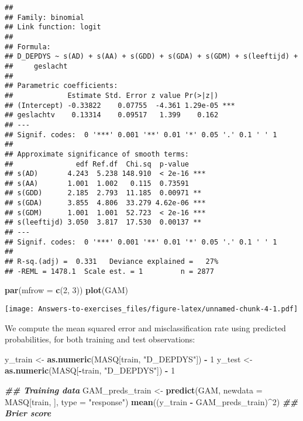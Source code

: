 \documentclass[
]{article}
\newenvironment{Shaded}{\begin{snugshade}}{\end{snugshade}}
\newcommand{\AttributeTok}[1]{\textcolor[rgb]{0.13,0.29,0.53}{#1}}
\newcommand{\DecValTok}[1]{\textcolor[rgb]{0.00,0.00,0.81}{#1}}
\newcommand{\DocumentationTok}[1]{\textcolor[rgb]{0.56,0.35,0.01}{\textbf{\textit{#1}}}}
\newcommand{\FunctionTok}[1]{\textcolor[rgb]{0.13,0.29,0.53}{\textbf{#1}}}
\newcommand{\NormalTok}[1]{#1}
\newcommand{\OtherTok}[1]{\textcolor[rgb]{0.56,0.35,0.01}{#1}}
\newcommand{\SpecialCharTok}[1]{\textcolor[rgb]{0.81,0.36,0.00}{\textbf{#1}}}
\newcommand{\StringTok}[1]{\textcolor[rgb]{0.31,0.60,0.02}{#1}}
\begin{document}
\begin{verbatim}
## 
## Family: binomial 
## Link function: logit 
## 
## Formula:
## D_DEPDYS ~ s(AD) + s(AA) + s(GDD) + s(GDA) + s(GDM) + s(leeftijd) + 
##     geslacht
## 
## Parametric coefficients:
##             Estimate Std. Error z value Pr(>|z|)    
## (Intercept) -0.33822    0.07755  -4.361 1.29e-05 ***
## geslachtv    0.13314    0.09517   1.399    0.162    
## ---
## Signif. codes:  0 '***' 0.001 '**' 0.01 '*' 0.05 '.' 0.1 ' ' 1
## 
## Approximate significance of smooth terms:
##               edf Ref.df  Chi.sq  p-value    
## s(AD)       4.243  5.238 148.910  < 2e-16 ***
## s(AA)       1.001  1.002   0.115  0.73591    
## s(GDD)      2.185  2.793  11.185  0.00971 ** 
## s(GDA)      3.855  4.806  33.279 4.62e-06 ***
## s(GDM)      1.001  1.001  52.723  < 2e-16 ***
## s(leeftijd) 3.050  3.817  17.530  0.00137 ** 
## ---
## Signif. codes:  0 '***' 0.001 '**' 0.01 '*' 0.05 '.' 0.1 ' ' 1
## 
## R-sq.(adj) =  0.331   Deviance explained =   27%
## -REML = 1478.1  Scale est. = 1         n = 2877
\end{verbatim}

\begin{Shaded}
\begin{Highlighting}[]
\FunctionTok{par}\NormalTok{(}\AttributeTok{mfrow =} \FunctionTok{c}\NormalTok{(}\DecValTok{2}\NormalTok{, }\DecValTok{3}\NormalTok{))}
\FunctionTok{plot}\NormalTok{(GAM)}
\end{Highlighting}
\end{Shaded}

\texttt{[image: Answers-to-exercises\_files/figure-latex/unnamed-chunk-4-1.pdf]}

We compute the mean squared error and misclassification rate using
predicted probabilities, for both training and test observations:

\begin{Shaded}
\begin{Highlighting}[]
\NormalTok{y\_train }\OtherTok{\textless{}{-}} \FunctionTok{as.numeric}\NormalTok{(MASQ[train, }\StringTok{"D\_DEPDYS"}\NormalTok{]) }\SpecialCharTok{{-}} \DecValTok{1}
\NormalTok{y\_test }\OtherTok{\textless{}{-}} \FunctionTok{as.numeric}\NormalTok{(MASQ[}\SpecialCharTok{{-}}\NormalTok{train, }\StringTok{"D\_DEPDYS"}\NormalTok{]) }\SpecialCharTok{{-}} \DecValTok{1}

\DocumentationTok{\#\# Training data}
\NormalTok{GAM\_preds\_train }\OtherTok{\textless{}{-}} \FunctionTok{predict}\NormalTok{(GAM, }\AttributeTok{newdata =}\NormalTok{ MASQ[train, ], }\AttributeTok{type =} \StringTok{"response"}\NormalTok{)}
\FunctionTok{mean}\NormalTok{((y\_train }\SpecialCharTok{{-}}\NormalTok{ GAM\_preds\_train)}\SpecialCharTok{\^{}}\DecValTok{2}\NormalTok{) }\DocumentationTok{\#\# Brier score}
\end{Highlighting}
\end{Shaded}
\end{document}
